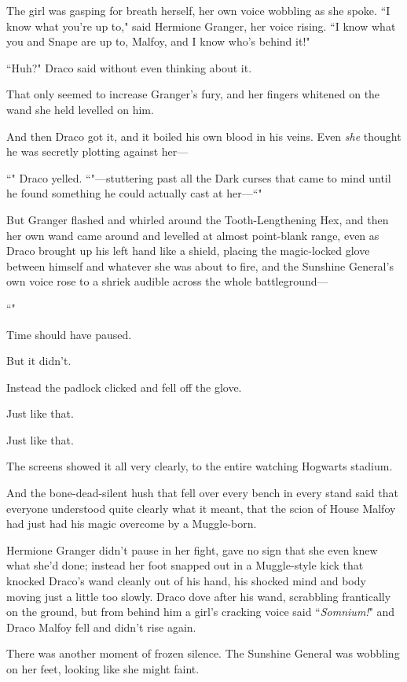 The girl was gasping for breath herself, her own voice wobbling as she spoke. ``I know what you're up to," said Hermione Granger, her voice rising. ``I know what you and Snape are up to, Malfoy, and I know who's behind it!"

``Huh?" Draco said without even thinking about it.

That only seemed to increase Granger's fury, and her fingers whitened on the wand she held levelled on him.

And then Draco got it, and it boiled his own blood in his veins. Even \emph{she} thought he was secretly plotting against her—

``" Draco yelled. ``"—stuttering past all the Dark curses that came to mind until he found something he could actually cast at her—``"

But Granger flashed and whirled around the Tooth-Lengthening Hex, and then her own wand came around and levelled at almost point-blank range, even as Draco brought up his left hand like a shield, placing the magic-locked glove between himself and whatever she was about to fire, and the Sunshine General's own voice rose to a shriek audible across the whole battleground—

``"

Time should have paused.

But it didn't.

Instead the padlock clicked and fell off the glove.

Just like that.

Just like that.

The screens showed it all very clearly, to the entire watching Hogwarts stadium.

And the bone-dead-silent hush that fell over every bench in every stand said that everyone understood quite clearly what it meant, that the scion of House Malfoy had just had his magic overcome by a Muggle-born.

Hermione Granger didn't pause in her fight, gave no sign that she even knew what she'd done; instead her foot snapped out in a Muggle-style kick that knocked Draco's wand cleanly out of his hand, his shocked mind and body moving just a little too slowly. Draco dove after his wand, scrabbling frantically on the ground, but from behind him a girl's cracking voice said ``\emph{Somnium!}" and Draco Malfoy fell and didn't rise again.

There was another moment of frozen silence. The Sunshine General was wobbling on her feet, looking like she might faint.

